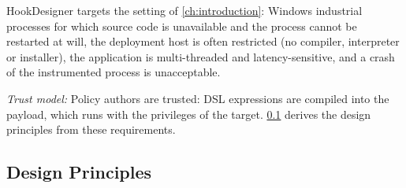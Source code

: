 HookDesigner targets the setting of \cref{ch:introduction}: Windows industrial processes for which source code is unavailable and the process cannot be restarted at will, the deployment host is often restricted (no compiler, interpreter or installer), the application is multi-threaded and latency-sensitive, and a crash of the instrumented process is unacceptable.

\emph{Trust model:} Policy authors are trusted: DSL expressions are compiled into the payload, which runs with the privileges of the target.
\cref{subsec:design_principles} derives the design principles from these requirements.
\subsection{Design Principles}
\label{subsec:design_principles}

